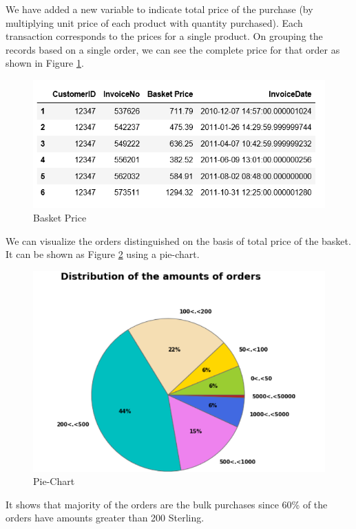 We have added a new variable to indicate total price of the purchase (by multiplying unit price of each product with quantity purchased). Each transaction corresponds to the prices for a single product. On grouping the records based on a single order, we can see the complete price for that order as shown in Figure \ref{2.5}.\\

\begin{figure}
\caption{Basket Price}
\label{2.5}
\centering
\includegraphics[width=\columnwidth]{images/2_5.PNG}
\end{figure}

We can visualize the orders distinguished on the basis of total price of the basket. It can be shown as Figure \ref{2.6} using a pie-chart.

\begin{figure}
\caption{Pie-Chart}
\label{2.6}
\centering
\includegraphics[width=\columnwidth]{images/2_6.PNG}
\end{figure}

It shows that majority of the orders are the bulk purchases since 60\% of the orders have amounts greater than 200 Sterling.


